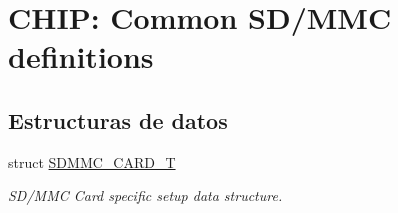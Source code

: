 \hypertarget{group___c_h_i_p___s_d_m_m_c___definitions}{}\section{C\+H\+IP\+: Common S\+D/\+M\+MC definitions}
\label{group___c_h_i_p___s_d_m_m_c___definitions}
\subsection*{Estructuras de datos}
\begin{DoxyCompactItemize}
\item 
struct \hyperlink{struct_s_d_m_m_c___c_a_r_d___t}{S\+D\+M\+M\+C\+\_\+\+C\+A\+R\+D\+\_\+T}
\begin{DoxyCompactList}\small\item\em S\+D/\+M\+MC Card specific setup data structure. \end{DoxyCompactList}\end{DoxyCompactItemize}
